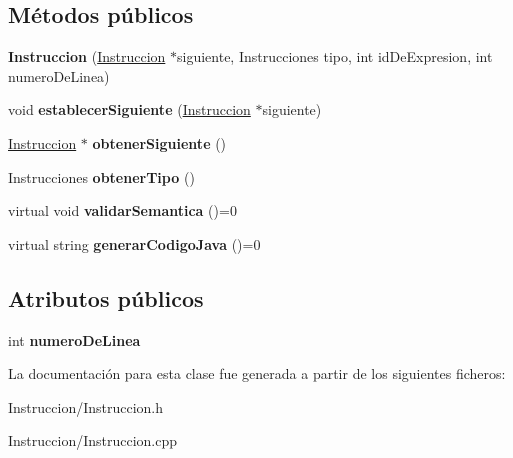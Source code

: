 \subsection*{Métodos públicos}
\begin{DoxyCompactItemize}
\item 
\hypertarget{class_instruccion_ac488690feaf3f74fb5f140135aa57443}{{\bfseries Instruccion} (\hyperlink{class_instruccion}{Instruccion} $\ast$siguiente, Instrucciones tipo, int id\-De\-Expresion, int numero\-De\-Linea)}\label{class_instruccion_ac488690feaf3f74fb5f140135aa57443}

\item 
\hypertarget{class_instruccion_aa7def8e8c05017486c73e3f66462f0b0}{void {\bfseries establecer\-Siguiente} (\hyperlink{class_instruccion}{Instruccion} $\ast$siguiente)}\label{class_instruccion_aa7def8e8c05017486c73e3f66462f0b0}

\item 
\hypertarget{class_instruccion_ae353ca3aa158c3cf6ae5597e078301c4}{\hyperlink{class_instruccion}{Instruccion} $\ast$ {\bfseries obtener\-Siguiente} ()}\label{class_instruccion_ae353ca3aa158c3cf6ae5597e078301c4}

\item 
\hypertarget{class_instruccion_a3221facd5e7fa4a41c2314e9f178a565}{Instrucciones {\bfseries obtener\-Tipo} ()}\label{class_instruccion_a3221facd5e7fa4a41c2314e9f178a565}

\item 
\hypertarget{class_instruccion_abf4bdd28d62ec646e5cf8fb735b997ab}{virtual void {\bfseries validar\-Semantica} ()=0}\label{class_instruccion_abf4bdd28d62ec646e5cf8fb735b997ab}

\item 
\hypertarget{class_instruccion_acb14226a5a304cd5c9abe69ac6143edb}{virtual string {\bfseries generar\-Codigo\-Java} ()=0}\label{class_instruccion_acb14226a5a304cd5c9abe69ac6143edb}

\end{DoxyCompactItemize}
\subsection*{Atributos públicos}
\begin{DoxyCompactItemize}
\item 
\hypertarget{class_instruccion_a55f89a7724ad2e918bc8bd03be885d1c}{int {\bfseries numero\-De\-Linea}}\label{class_instruccion_a55f89a7724ad2e918bc8bd03be885d1c}

\end{DoxyCompactItemize}


La documentación para esta clase fue generada a partir de los siguientes ficheros\-:\begin{DoxyCompactItemize}
\item 
Instruccion/Instruccion.\-h\item 
Instruccion/Instruccion.\-cpp\end{DoxyCompactItemize}
